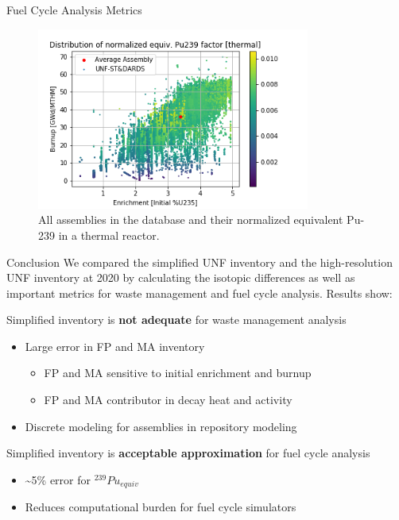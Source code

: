 \documentclass[final]{beamer}
\newlength{\onecolwid}
\newlength{\threecolwid}
\begin{document}
\begin{frame}[t]
\begin{columns}[t,totalwidth=\threecolwid]
\begin{column}{\onecolwid}
\begin{block}{Fuel Cycle Analysis Metrics}
\begin{figure}
    \centering
    \includegraphics[width=0.8\textwidth]{../images/thermal_all.png}
    \caption{All assemblies in the database and their normalized equivalent Pu-239 in a thermal reactor.}
    \label{fig:thermal_all}
\end{figure}
\end{block}

\begin{alertblock}{Conclusion}
We compared the simplified \gls{UNF}
inventory and the high-resolution \gls{UNF} inventory
at 2020 by calculating the isotopic differences as well
as important metrics for waste management and fuel cycle analysis. Results show:
\bigskip \bigskip

Simplified inventory is \textbf{not adequate} for waste management analysis
    \begin{itemize}
        \item Large error in FP and MA inventory
        \begin{itemize}
            \item FP and MA sensitive to initial enrichment and burnup
            \item FP and MA contributor in decay heat and activity
        \end{itemize}
        \item Discrete modeling for assemblies in repository modeling
    \end{itemize}
\bigskip \bigskip

Simplified inventory is \textbf{acceptable approximation} for fuel cycle analysis
    \begin{itemize}
        \item \textasciitilde 5\% error for $^{239}Pu_{equiv}$
        \item Reduces computational burden for fuel cycle simulators
    \end{itemize}
\end{alertblock}


\end{column}
\end{columns}
\end{frame}
\end{document}
